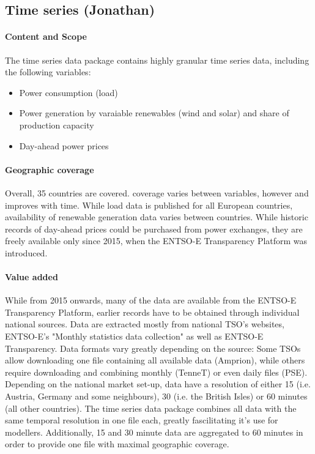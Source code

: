 \documentclass[article]{elsarticle}
\begin{document}
\subsection{Time series (Jonathan)}
\label{subsec:time series}

\paragraph{Content and Scope}
The time series data package contains highly granular time series data, including the following variables:
\begin{itemize}
    \item Power consumption (load)
    \item Power generation by varaiable renewables (wind and solar) and share of production capacity 
    \item Day-ahead power prices
\end{itemize}

\paragraph{Geographic coverage}
Overall, 35 countries are covered. coverage varies between variables, however and improves with time. While load data is published for all European countries, availability of renewable generation data varies between countries. While historic records of day-ahead prices could be purchased from power exchanges, they are freely available only since 2015, when the ENTSO-E Transparency Platform was introduced.

\paragraph{Value added}
While from 2015 onwards, many of the data are available from the ENTSO-E Transparency Platform, earlier records have to be obtained through individual national sources. Data are extracted mostly from national TSO's websites, ENTSO-E's "Monthly statistics data collection" as well as ENTSO-E Transparency. Data formats vary greatly depending on the source: Some TSOs allow downloading one file containing all available data (Amprion), while others require downloading and combining monthly (TenneT) or even daily files (PSE). Depending on the national market set-up, data have a resolution of either 15 (i.e. Austria, Germany and some neighbours), 30 (i.e. the British Isles) or 60 minutes (all other countries). The time series data package combines all data with the same temporal resolution in one file each, greatly fascilitating it's use for modellers. Additionally, 15 and 30 minute data are aggregated to 60 minutes in order to provide one file with maximal geographic coverage.
\end{document}
